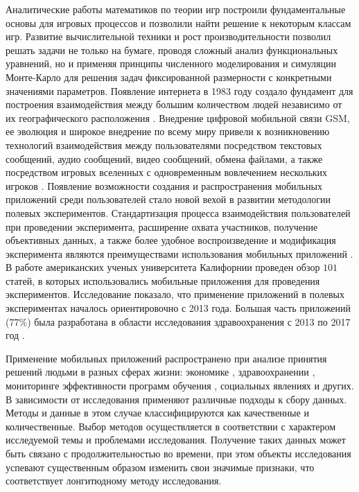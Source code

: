 Аналитические работы математиков по теории игр построили фундаментальные основы для игровых процессов и позволили найти решение к некоторым классам игр. Развитие вычислительной техники и рост производительности позволил решать задачи не только на бумаге, проводя сложный анализ функциональных уравнений, но и применяя принципы численного моделирования и симуляции Монте-Карло \cite{Sobol_monte-carlo_1968} для решения задач фиксированной размерности с конкретными значениями параметров. Появление интернета в 1983 году создало фундамент для построения взаимодействия между большим количеством людей независимо от их географического расположения \cite{Barbruk_internet_2015}. Внедрение цифровой мобильной связи GSM, ее эволюция и широкое внедрение по всему миру привели к возникновению технологий взаимодействия между пользователями посредством текстовых сообщений, аудио сообщений, видео сообщений, обмена файлами, а также посредством игровых вселенных с одновременным вовлечением нескольких игроков \cite{teslenko_cell_network_2018}. Появление возможности создания и распространения мобильных приложений среди пользователей стало новой вехой в развитии методологии полевых экспериментов. Стандартизация процесса взаимодействия пользователей при проведении эксперимента, расширение охвата участников, получение объективных данных, а также более удобное воспроизведение и модификация эксперимента являются преимуществами использования мобильных приложений 
\cite{zhang_advantages_2018}. В работе американских ученых университета Калифорнии проведен обзор $101$ статей, в которых использовались мобильные приложения для проведения экспериментов.
Исследование показало, что применение приложений в полевых экспериментах началось ориентировочно с 2013 года. Большая часть приложений ($77\%$) была разработана в области исследования здравоохранения с 2013 по 2017 год \cite{zhang_advantages_2018}.

Применение мобильных приложений распространено при анализе принятия решений людьми в разных сферах жизни: 
экономике \cite{li_conducting_2021}, здравоохранении \cite{zhang_efficacy_2015, serkh_optimal_2014},
мониторинге эффективности программ обучения \cite{menon_application_2021}, социальных явлениях \cite{chataway_geography_2017} и других. В зависимости от исследования применяют различные подходы к сбору данных. Методы и данные в этом случае классифицируются как качественные и количественные. Выбор методов осуществляется в соответствии с характером исследуемой темы и проблемами исследования. Получение таких данных может быть связано с продолжительностью во времени, при этом объекты исследования успевают существенным образом изменить свои значимые признаки, что соответствует лонгитюдному методу исследования. 

